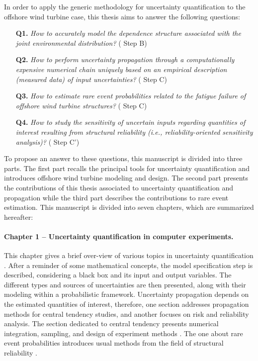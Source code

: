 In order to apply the generic methodology for uncertainty quantification to the offshore wind turbine case, this thesis aims to answer the following questions: 
\begin{itemize}
    \item[\textbf{Q1.}] \textit{
    How to accurately model the dependence structure associated with the joint environmental distribution? 
    } ( Step B)
    \item[\textbf{Q2.}] \textit{
    How to perform uncertainty propagation through a computationally expensive numerical chain uniquely based on an empirical description (measured data) of input uncertainties?
    } ( Step C)
    \item[\textbf{Q3.}] \textit{
    How to estimate rare event probabilities related to the fatigue failure of offshore wind turbine structures?
    } ( Step C)
    \item[\textbf{Q4.}] \textit{
    How to study the sensitivity of uncertain inputs regarding quantities of interest resulting from structural reliability (i.e., reliability-oriented sensitivity analysis)? 
    } ( Step C')
\end{itemize}

To propose an answer to these questions, this manuscript is divided into three parts. 
The first part recalls the principal tools for uncertainty quantification and introduces offshore wind turbine modeling and design. 
The second part presents the contributions of this thesis associated to uncertainty quantification and propagation while the third part describes the contributions to rare event estimation. 
This manuscript is divided into seven chapters, which are summarized hereafter: 

\paragraph{Chapter 1 -- Uncertainty quantification in computer experiments.} 
This chapter gives a brief over-view of various topics in uncertainty quantification \citep{sullivan_2015}. 
After a reminder of some mathematical concepts, the model specification step is described, considering a black box and its input and output variables. 
The different types and sources of uncertainties are then presented, along with their modeling within a probabilistic framework. 
Uncertainty propagation depends on the estimated quantities of interest, therefore, one section addresses propagation methods for central tendency studies, and another focuses on risk and reliability analysis. 
The section dedicated to central tendency presents numerical integration, sampling, and design of experiment methods \citep{fang_liu_2018}. 
The one about rare event probabilities introduces usual methods from the field of structural reliability \citep{lemaire_2009,MorioBalesdent2015}. 

